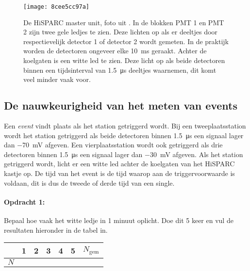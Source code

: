 \begin{figure}[ht]
    \centering
    \texttt{[image: 8cee5cc97a]}
    \caption{De HiSPARC master unit, foto uit \cite{nikhefhisparc}. In de
             blokken PMT 1 en PMT 2 zijn twee gele ledjes te zien. Deze
             lichten op als er deeltjes door respectievelijk detector 1
             of detector 2 wordt gemeten. In de praktijk worden de
             detectoren ongeveer elke \SI{10}{\milli\second} geraakt.
             Achter de koelgaten is een witte led te zien. Deze licht op
             als beide detectoren binnen een tijdsinterval van
             \SI{1.5}{\micro\second} deeltjes waarnemen, dit komt veel
             minder vaak voor.}
\end{figure}


\subsection{De nauwkeurigheid van het meten van events}

Een \emph{event} vindt plaats als het station getriggerd wordt.
Bij een tweeplaatsstation wordt het station getriggerd als beide detectoren
binnen \SI{1,5}{\micro\second} een signaal lager dan \SI{-70}{\milli\volt}
afgeven. Een vierplaatsstation wordt ook getriggerd als drie detectoren
binnen \SI{1,5}{\micro\second} een signaal lager dan \SI{-30}{\milli\volt}
afgeven. Als het station getriggerd wordt, licht er een witte led
achter de koelgaten van het HiSPARC kastje op. De tijd van het event
is de tijd waarop aan de triggervoorwaarde is voldaan, dit is dus
de tweede of derde tijd van een single.

\begin{minipage}[t]{1\columnwidth}%

\paragraph{Opdracht 1:}

Bepaal hoe vaak het witte ledje in 1 minuut oplicht. Doe dit 5 keer
en vul de resultaten hieronder in de tabel in.

\begin{tabular}{|x{.11\textwidth}|x{.11\textwidth}|x{.11\textwidth}
                |x{.11\textwidth}|x{.11\textwidth}|x{.11\textwidth}
                |x{.11\textwidth}|}
     & 1 & 2 & 3 & 4 & 5 & $N_\textrm{gem}$\\
    \hline 
    $N$ &  &  &  &  &  & \tabularnewline
    \hline 
\end{tabular}%
\end{minipage}

